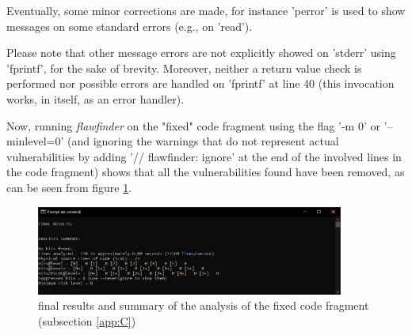 Eventually, some minor corrections are made, for instance 'perror' is used to show messages on some standard errors (e.g., on 'read').

Please note that other message errors are not explicitly showed on 'stderr'\parencite{stdin} using 'fprintf', for the sake of brevity.
Moreover, neither a return value check is performed nor possible errors are handled on 'fprintf' at line 40 (this invocation works, in itself, as an error handler).

Now, running \textit{flawfinder} on the "fixed" code fragment using the flag '-m 0' or '--minlevel=0' (and ignoring the warnings that do not represent actual vulnerabilities by adding '// flawfinder: ignore' at the end of the involved lines in the code fragment) shows that all the vulnerabilities found have been removed, as can be seen from figure \ref{fig:final_results_and_analysis_summary_fixed}.
 \begin{figure}[H]
    \centering
    \includegraphics[width=0.9\textwidth]{Resources/final_results_and_analysis_summary_fixed.PNG}
    \caption{final results and summary of the analysis of the fixed code fragment (subsection \ref{app:C})}
    \label{fig:final_results_and_analysis_summary_fixed}
\end{figure}
